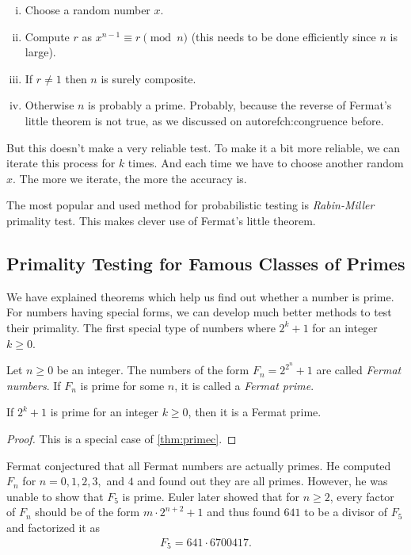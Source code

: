 \documentclass{subfiles}
\begin{document}
		\begin{enumerate}[i.]
			\item Choose a random number $x$.
			\item Compute $r$ as $x^{n-1}\equiv r\pmod n$ (this needs to be done efficiently since $n$ is large).
			\item If $r\neq1$ then $n$ is surely composite.
			\item Otherwise $n$ is probably a prime. Probably, because the reverse of Fermat's little theorem is not true, as we discussed on autoref{ch:congruence} before.
		\end{enumerate}
	But this doesn't make a very reliable test. To make it a bit more reliable, we can iterate this process for $k$ times. And each time we have to choose another random $x$. The more we iterate, the more the accuracy is.

	The most popular and used method for probabilistic testing is \textit{Rabin-Miller} primality test. This makes clever use of Fermat's little theorem.

\subsection{Primality Testing for Famous Classes of Primes}
	We have explained theorems which help us find out whether a number is prime. For numbers having special forms, we can develop much better methods to test their primality. The first special type of numbers where $2^k+1$ for an integer $k \geq 0$.

		\begin{definition}
			Let $n\geq 0$ be an integer. The numbers of the form $F_n = 2^{2^n}+1$ are called \textit{Fermat numbers}. If $F_n$ is prime for some $n$, it is called a \textit{Fermat prime}.
		\end{definition}

		\begin{proposition}
			If $2^k+1$ is prime for an integer $k \geq 0$, then it is a Fermat prime.
		\end{proposition}

		\begin{proof}
			This is a special case of \autoref{thm:primec}.
		\end{proof}

	Fermat conjectured that all Fermat numbers are actually primes. He computed $F_n$ for $n=0,1,2,3,$ and $4$ and found out they are all primes. However, he was unable to show that $F_5$ is prime. Euler later showed that for $n\geq 2$, every factor of $F_n$ should be of the form $m\cdot 2^{n+2}+1$ and thus found $641$ to be a divisor of $F_5$ and factorized it as
		\begin{align*}
		F_5 = 641 \cdot 6700417.
		\end{align*}
\end{document}
